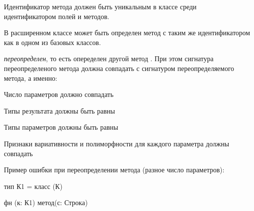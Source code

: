 Идентификатор метода должен быть уникальным в классе среди идентификатором полей и методов. 

В расширенном классе может быть определен метод с таким же идентификатором как в одном из базовых классов.

\emph{переопределен}, то есть опеределен другой метод . При этом сигнатура переопределеного метода должна совпадать с сигнатуром переопределяемого метода, а именно:
\begin{d_itemize}
\item
    Число параметров должно совпадать
\item
    Типы  результата должны быть равны 
\item
    Типы  параметров должны быть равны 
\item 
    Признаки вариативности и полиморфности для каждого параметра должны совпадать
\end{d_itemize}

Пример ошибки при переопределении метода (разное число параметров):
\begin{SampleErr}[vspace=2pt]
тип К1 = класс (К) {}

фн (к: К1) метод(с: Строка) {}
\end{SampleErr}